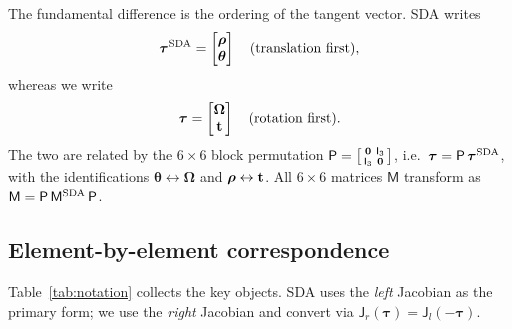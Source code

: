 \documentclass[journal]{IEEEtran}
\newcommand{\bfOmega}{\boldsymbol{\Omega}}
\newcommand{\bftau}{\boldsymbol{\tau}}
\newcommand{\bfrho}{\boldsymbol{\rho}}
\newcommand{\bftheta}{\boldsymbol{\theta}}
\newcommand{\beq}{\begin{equation}}
\newcommand{\eeq}{\end{equation}}
\begin{document}
The fundamental difference is the ordering of the tangent vector.
SDA writes
\beq
    \bftau^{\rm SDA} = \begin{bmatrix} \bfrho \\ \bftheta \end{bmatrix}
    \quad\text{(translation first)},
    \label{eq:sdatangent}
\eeq
whereas we write
\beq
    \bftau = \begin{bmatrix} \bfOmega \\ {\bf t} \end{bmatrix}
    \quad\text{(rotation first)}.
    \label{eq:ourtangent}
\eeq
The two are related by the $6\times 6$ block permutation
$\mathsf{P} = \left[\begin{smallmatrix} \bf 0 & \mathsf{I}_3 \\ \mathsf{I}_3 & \bf 0 \end{smallmatrix}\right]$, i.e.\
$\bftau = \mathsf{P}\,\bftau^{\rm SDA}$,
with the identifications $\bftheta \leftrightarrow \bfOmega$ and
$\bfrho \leftrightarrow {\bf t}$.
All $6\times 6$ matrices $\mathsf{M}$ transform as
$\mathsf{M} = \mathsf{P}\,\mathsf{M}^{\rm SDA}\,\mathsf{P}$.

\subsection{Element-by-element correspondence}

Table~\ref{tab:notation} collects the key objects.
SDA uses the \emph{left} Jacobian as the primary form;
we use the \emph{right} Jacobian and convert via
$\mathsf{J}_r(\bftau) = \mathsf{J}_l(-\bftau)$.
\end{document}
